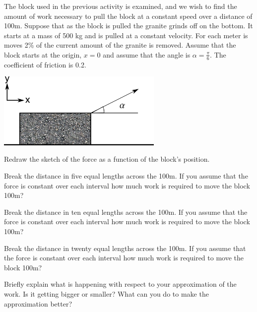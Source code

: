 \begin{problem}
\item The block used in the previous activity is examined, and we wish
  to find the amount of work necessary to pull the block at a constant
  speed over a distance of 100m.  Suppose that as the block is pulled
  the granite grinds off on the bottom. It starts at a mass of 500 kg
  and is pulled at a constant velocity. For each meter is moves 2\% of
  the current amount of the granite is removed. Assume that the block
  starts at the origin, $x=0$ and assume that the angle is
  $\alpha=\frac{\pi}{6}$. The coefficient of friction is 0.2.

  \includegraphics[width=8cm]{ink/week7/dragBlock}

  \begin{subproblem}
  \item Redraw the sketch of the force as a function of the block's
    position.

    \vfill

  \item Break the distance in five equal lengths across the 100m.  If
    you assume that the force is constant over each interval how much
    work is required to move the block 100m?

    \vfill

    \clearpage

  \item Break the distance in ten equal lengths across the 100m.  If
    you assume that the force is constant over each interval how much
    work is required to move the block 100m?

    \vfill

  \item Break the distance in twenty equal lengths across the 100m.  If
    you assume that the force is constant over each interval how much
    work is required to move the block 100m?

    \vfill

  \item Briefly explain what is happening with respect to your
    approximation of the work. Is it getting bigger or smaller? What
    can you do to make the approximation better?

    \vspace{3em}

  \end{subproblem}
\end{problem}

